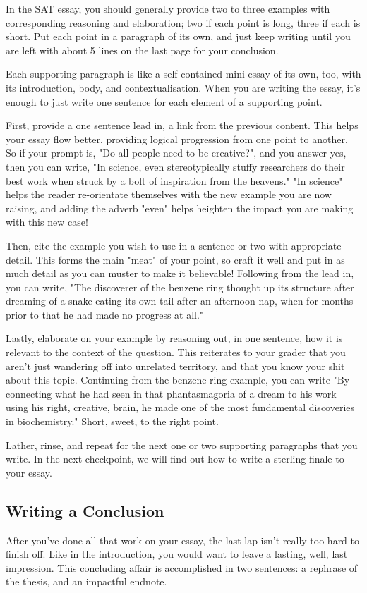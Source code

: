 \documentclass[DIV=calc,11pt,parskip,numbers=noenddot]{scrartcl} %
\begin{document}
In the SAT essay, you should generally provide two to three examples with corresponding reasoning and elaboration; two if each point is long, three if each is short. Put each point in a paragraph of its own, and just keep writing until you are left with about 5 lines on the last page for your conclusion.

Each supporting paragraph is like a self-contained mini essay of its own, too, with its introduction, body, and contextualisation. When you are writing the essay, it’s enough to just write one sentence for each element of a supporting point.

First, provide a one sentence lead in, a link from the previous content. This helps your essay flow better, providing logical progression from one point to another. So if your prompt is, "Do all people need to be creative?", and you answer yes, then you can write, "In science, even stereotypically stuffy researchers do their best work when struck by a bolt of inspiration from the heavens." "In science" helps the reader re-orientate themselves with the new example you are now raising, and adding the adverb "even" helps heighten the impact you are making with this new case!

Then, cite the example you wish to use in a sentence or two with appropriate detail. This forms the main "meat" of your point, so craft it well and put in as much detail as you can muster to make it believable! Following from the lead in, you can write, "The discoverer of the benzene ring thought up its structure after dreaming of a snake eating its own tail after an afternoon nap, when for months prior to that he had made no progress at all."

Lastly, elaborate on your example by reasoning out, in one sentence, how it is relevant to the context of the question. This reiterates to your grader that you aren’t just wandering off into unrelated territory, and that you know your shit about this topic. Continuing from the benzene ring example, you can write "By connecting what he had seen in that phantasmagoria of a dream to his work using his right, creative, brain, he made one of the most fundamental discoveries in biochemistry." Short, sweet, to the right point.

Lather, rinse, and repeat for the next one or two supporting paragraphs that you write. In the next checkpoint, we will find out how to write a sterling finale to your essay.
\subsection{Writing a Conclusion}
After you’ve done all that work on your essay, the last lap isn’t really too hard to finish off. Like in the introduction, you would want to leave a lasting, well, last impression. This concluding affair is accomplished in two sentences: a rephrase of the thesis, and an impactful endnote.
\end{document}

